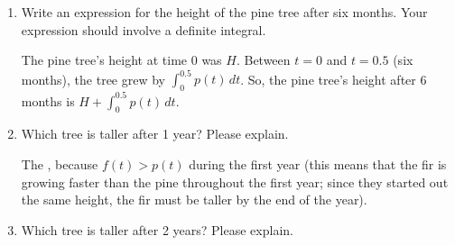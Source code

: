 \documentclass{article}
\begin{document}
\begin{enumerate}
  \begin{center}
  \end{center}

  \begin{enumerate}
  \item
    \begin{problem}[\vfill]
      Write an expression for the height of the pine tree after six
      months.  Your expression should involve a definite integral.  
    \end{problem}

    \begin{solution}
      The pine tree's 
      height at time $0$  was $H$.  Between $t = 0$ and $t = 0.5$ (six
      months), the tree grew by $\displaystyle \int_0^{0.5} p(t)\,dt$.  So,
      the pine tree's height after 6 months is $\boxed{H + \int_0^{0.5}
        p(t)\,dt}$. 
    \end{solution}

  \item
    \begin{problem}[\vfill]
      Which tree is taller after 1 year?  Please explain. 
    \end{problem}

    \begin{solution}
      The , because $f(t) > p(t)$ during the first year (this
      means that the fir is growing faster than the pine throughout the
      first year; since they started out the same height, the fir must be
      taller by the end of the year).
    \end{solution}

  \item
    \begin{problem}[\vfill]
      Which tree is taller after 2 years?  Please explain. 
    \end{problem}


\end{enumerate}
\end{enumerate}
\end{document}
